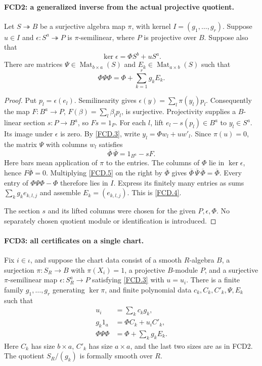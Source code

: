 \paragraph{FCD2: a generalized inverse from the actual projective quotient.}
\label{claim:FCD2}
Let $S\twoheadrightarrow B$ be a surjective algebra map $\pi$,
with kernel $I=(g_1,\ldots,g_r)$.  Suppose $u\in I$ and
$\epsilon:S^a\twoheadrightarrow P$ is $\pi$-semilinear, where
$P$ is projective over $B$.  Suppose also that
\[
 \ker\epsilon=\Phi S^b+uS^a.                          \tag{FCD.3}\label{FCD.3}
\]
There are matrices $\Psi\in\operatorname{Mat}_{b\times a}(S)$
and $E_k\in\operatorname{Mat}_{a\times b}(S)$ such that
\[
 \Phi\Psi\Phi=\Phi+\sum_{k=1}^r g_kE_k.              \tag{FCD.4}\label{FCD.4}
\]

\begin{proof}
Put $p_l=\epsilon(e_l)$.  Semilinearity gives
$\epsilon(y)=\sum_l\pi(y_l)p_l$.  Consequently the map
$F:B^a\to P$, $F(\beta)=\sum_l\beta_lp_l$, is surjective.
Projectivity supplies a $B$-linear section $s:P\to B^a$, so
$Fs=1_P$.  For each $l$, lift $e_l-s(p_l)\in B^a$ to
$y_l\in S^a$.  Its image under $\epsilon$ is zero.  By
\eqref{FCD.3}, write $y_l=\Phi w_l+u w'_l$.  Since $\pi(u)=0$,
the matrix $\Psi$ with columns $w_l$ satisfies
\[
 \overline\Phi\,\overline\Psi=1_{B^a}-sF.           \tag{FCD.5}\label{FCD.5}
\]
Here bars mean application of $\pi$ to the entries.  The columns
of $\Phi$ lie in $\ker\epsilon$, hence $F\overline\Phi=0$.
Multiplying \eqref{FCD.5} on the right by $\overline\Phi$ gives
$\overline\Phi\,\overline\Psi\,\overline\Phi
=\overline\Phi$.  Every entry of
$\Phi\Psi\Phi-\Phi$ therefore lies in $I$.
Express its finitely many entries as sums $\sum_k g_k e_{k,l,j}$
and assemble $E_k=(e_{k,l,j})$.  This is \eqref{FCD.4}.

The section $s$ and its lifted columns were chosen for the given
$P,\epsilon,\Phi$.  No separately chosen quotient module or
identification is introduced.
\end{proof}

\paragraph{FCD3: all certificates on a single chart.}
\label{claim:FCD3}
Fix $i\in\iota$, and suppose the chart data consist of a smooth
$R$-algebra $B$, a surjection $\pi:S_R\to B$ with
$\pi(X_i)=1$, a projective $B$-module $P$, and a surjective
$\pi$-semilinear map $\epsilon:S_R^a\to P$ satisfying
\eqref{FCD.3} with $u=u_i$.
There is a finite family $g_1,\ldots,g_r$ generating $\ker\pi$,
and finite polynomial data $c_k,C_k,C'_k,\Psi,E_k$ such that
\begin{align}
 u_i&=\sum_k c_kg_k,\nonumber\\
 g_k1_a&=\Phi C_k+u_iC'_k,\nonumber\\
 \Phi\Psi\Phi&=\Phi+\sum_k g_kE_k.                   \tag{FCD.6}\label{FCD.6}
\end{align}
Here $C_k$ has size $b\times a$, $C'_k$ has size $a\times a$,
and the last two sizes are as in FCD2.  The quotient $S_R/(g_k)$
is formally smooth over $R$.


